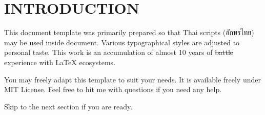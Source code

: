 
\section{INTRODUCTION}

This document template was primarily prepared so that
Thai scripts (อักษรไทย) may be used inside \XeLaTeX{} document.
Various typographical styles are adjusted to personal taste.
This work is an accumulation of almost 10 years of \sout{battle} experience with \LaTeX{} ecosystems.

You may freely adapt this template to suit your needs.
It is available freely under MIT License.
Feel free to hit me with questions if you need any help.

Skip to the next section if you are ready.

\lipsum[1]

